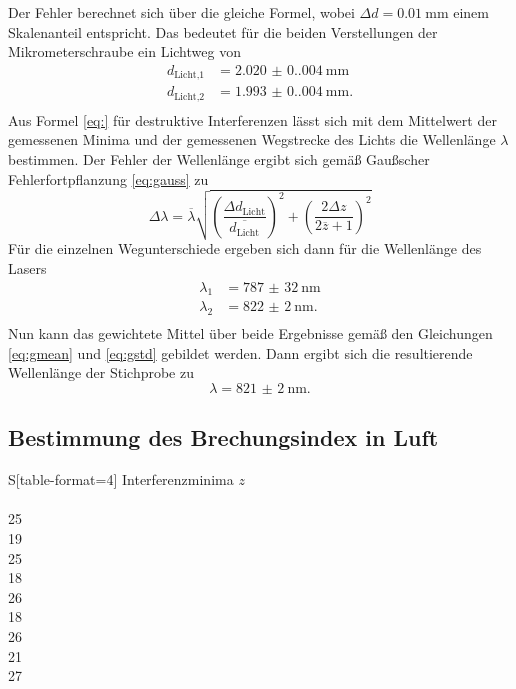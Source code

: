 Der Fehler berechnet sich über die gleiche Formel, wobei $\Delta d=\qty{0.01}{\mm}$ einem Skalenanteil entspricht.
Das bedeutet für die beiden Verstellungen der Mikrometerschraube ein Lichtweg von 
\begin{align*}
  d_\text{Licht,1}&=\qty{2.020(0.004)}{\mm}\\
  d_\text{Licht,2}&=\qty{1.993(0.004)}{\mm}.\\
\end{align*}
Aus Formel \eqref{eq:} für destruktive Interferenzen lässt sich mit dem Mittelwert der gemessenen Minima und der 
gemessenen Wegstrecke des Lichts die Wellenlänge $\lambda$ bestimmen. Der Fehler der Wellenlänge ergibt sich gemäß Gaußscher Fehlerfortpflanzung \eqref{eq:gauss} zu 
\begin{equation*}
    \Delta \lambda =\overline{\lambda}\sqrt{\left(\frac{\Delta d_\text{Licht}}{\overline{d_\text{Licht}}}\right)^2+\left(\frac{2\Delta z }{2\overline{z}+1}\right)^2}
\end{equation*}
Für die einzelnen Wegunterschiede ergeben sich dann für die Wellenlänge des Lasers 
\begin{align*}
  \lambda_1&=\qty{787(32)}{\nm}\\
  \lambda_2&=\qty{822(2)}{\nm}.\\
\end{align*}
Nun kann das gewichtete Mittel über beide Ergebnisse gemäß den Gleichungen \eqref{eq:gmean} und \eqref{eq:gstd}
gebildet werden. Dann ergibt sich die resultierende Wellenlänge der Stichprobe zu 
\begin{equation*}
    \lambda=\qty{821(2)}{\nm}.
\end{equation*}
\subsection{Bestimmung des Brechungsindex in Luft}

\begin{table}[H]
  \centering
  \caption{Messwerte zur Bestimmung des Brechungsindex von Luft.}
  \label{tab:Index}
  \begin{tabular}{S[table-format=4]}
    \toprule
    {Interferenzminima $z$ }\\
     \\
    25 \\
    19 \\
    25 \\
    18 \\
    26 \\
    18 \\
    26 \\
    21 \\
    27 \\
    \bottomrule
  \end{tabular}
\end{table}